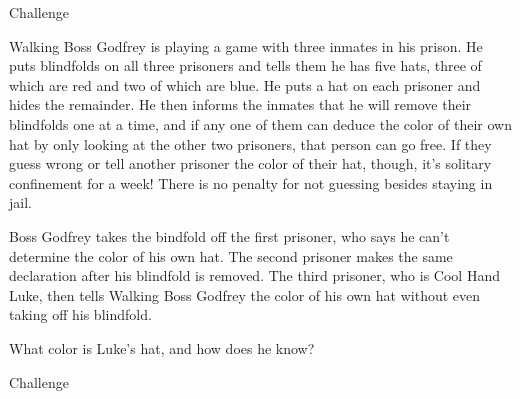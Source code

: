\begin{tagblock}{Challenge}
\begin{question}[CHALLENGE!!!]

Walking Boss Godfrey is playing a game with three inmates in his prison. He puts blindfolds on all three prisoners and tells them he has five hats, three of which are red and two of which are blue. He puts a hat on each prisoner and hides the remainder. He then informs the inmates that he will remove their blindfolds one at a time, and if any one of them can deduce the color of their own hat by only looking at the other two prisoners, that person can go free. If they guess wrong or tell another prisoner the color of their hat, though, it's solitary confinement for a week! There is no penalty for not guessing besides staying in jail.

Boss Godfrey takes the bindfold off the first prisoner, who says he can't determine the color of his own hat. The second prisoner makes the same declaration after his blindfold is removed. The third prisoner, who is Cool Hand Luke, then tells Walking Boss Godfrey the color of his own hat without even taking off his blindfold.

What color is Luke's hat, and how does he know?
	
	
\begin{tags}
	    Challenge
\end{tags}
	
\begin{diary}
\end{diary}
		
\begin{solution}
       
\end{solution}

\end{question}

\end{tagblock}



